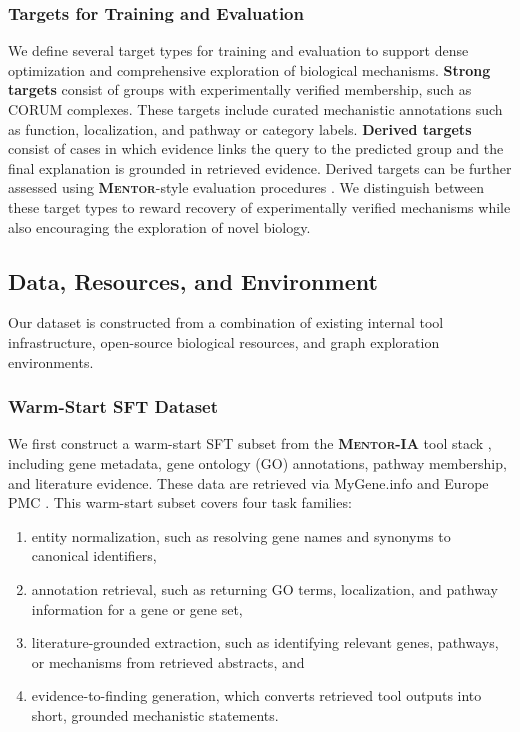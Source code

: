 \documentclass[thesis,letterpaper,12pt]{utthesis}
\begin{document}
\subsubsection{Targets for Training and Evaluation}
We define several target types for training and evaluation to support dense optimization and comprehensive exploration of biological mechanisms. \textbf{Strong targets} consist of groups with experimentally verified membership, such as CORUM complexes. These targets include curated mechanistic annotations such as function, localization, and pathway or category labels. \textbf{Derived targets} consist of cases in which evidence links the query to the predicted group and the final explanation is grounded in retrieved evidence. Derived targets can be further assessed using \textbf{\textsc{Mentor}}-style evaluation procedures \cite{mentor}. We distinguish between these target types to reward recovery of experimentally verified mechanisms while also encouraging the exploration of novel biology.

\subsection{Data, Resources, and Environment}\label{sec:data}
Our dataset is constructed from a combination of existing internal tool infrastructure, open-source biological resources, and graph exploration environments.

\subsubsection{Warm-Start SFT Dataset} 
We first construct a warm-start SFT subset from the \textbf{\textsc{Mentor-IA}} tool stack \cite{mentor-ia}, including gene metadata, gene ontology (GO) annotations, pathway membership, and literature evidence. These data are retrieved via MyGene.info \cite{mygene.info} and Europe PMC \cite{europepmc}. This warm-start subset covers four task families:
\begin{enumerate}
    \item entity normalization, such as resolving gene names and synonyms to canonical identifiers,
    \item annotation retrieval, such as returning GO terms, localization, and pathway information for a gene or gene set,
    \item literature-grounded extraction, such as identifying relevant genes, pathways, or mechanisms from retrieved abstracts, and
    \item evidence-to-finding generation, which converts retrieved tool outputs into short, grounded mechanistic statements.
\end{enumerate}
\end{document}
